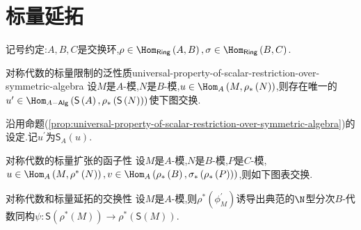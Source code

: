 \section{标量延拓}

记号约定:$A,B,C$是交换环,$\rho\in\Hom_{\mathsf{Ring}}\left(A,B\right),\sigma\in\Hom_{\mathsf{Ring}}\left(B,C\right)$.

\begin{proposition}{对称代数的标量限制的泛性质}{universal-property-of-scalar-restriction-over-symmetric-algebra}
	设$M$是$A$-模,$N$是$B$-模,$u\in\Hom_{A}\left(M,\rho_{\ast}\left(N\right)\right)$,则存在唯一的$u^{\prime}\in\Hom_{A-\mathsf{Alg}}\left(\mathsf{S}\left(A\right),\rho_{\ast}\left(\mathsf{S}\left(N\right)\right)\right)$使下图交换.
	\begin{center}
	\end{center}
\end{proposition}

\begin{definition}{}{}
	沿用命题(\cref{prop:universal-property-of-scalar-restriction-over-symmetric-algebra})的设定.记$u^{\prime}$为$\mathsf{S}_{A}\left(u\right)$.
\end{definition}

\begin{proposition}{对称代数的标量扩张的函子性}{}
	设$M$是$A$-模,$N$是$B$-模,$P$是$C$-模,$u\in\Hom_{A}\left(M,\rho^{\ast}\left(N\right)\right),v\in\Hom_{A}\left(\rho_{\ast}\left(B\right),\sigma_{\ast}\left(\rho_{\ast}\left(P\right)\right)\right)$,则如下图表交换.
	\begin{center}
	\end{center}
\end{proposition}

\begin{proposition}{对称代数和标量延拓的交换性}{}
	设$M$是$A$-模,则$\rho^{\ast}\left(\phi_{M}^{\prime}\right)$诱导出典范的$\N$型分次$B$-代数同构$\psi:\mathsf{S}\left(\rho^{\ast}\left(M\right)\right)\to\rho^{\ast}\left(\mathsf{S}\left(M\right)\right)$.
\end{proposition}